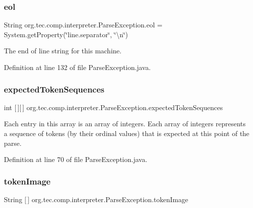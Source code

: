 \subsubsection{\texorpdfstring{eol}{eol}}
{\footnotesize\ttfamily String org.\+tec.\+comp.\+interpreter.\+Parse\+Exception.\+eol = System.\+get\+Property(\char`\"{}line.\+separator\char`\"{}, \char`\"{}\textbackslash{}n\char`\"{})\hspace{0.3cm}{\ttfamily [protected]}}

The end of line string for this machine. 

Definition at line 132 of file Parse\+Exception.\+java.

\mbox{\label{classorg_1_1tec_1_1comp_1_1interpreter_1_1_parse_exception_a8cf72289f91938ae2faa2a001b8c3ae3}} 
\subsubsection{\texorpdfstring{expected\+Token\+Sequences}{expectedTokenSequences}}
{\footnotesize\ttfamily int \mbox{[}$\,$\mbox{]}\mbox{[}$\,$\mbox{]} org.\+tec.\+comp.\+interpreter.\+Parse\+Exception.\+expected\+Token\+Sequences}

Each entry in this array is an array of integers. Each array of integers represents a sequence of tokens (by their ordinal values) that is expected at this point of the parse. 

Definition at line 70 of file Parse\+Exception.\+java.

\mbox{\label{classorg_1_1tec_1_1comp_1_1interpreter_1_1_parse_exception_a13a85a0e7a0e560a3191ed4f6be1c127}} 
\subsubsection{\texorpdfstring{token\+Image}{tokenImage}}
{\footnotesize\ttfamily String \mbox{[}$\,$\mbox{]} org.\+tec.\+comp.\+interpreter.\+Parse\+Exception.\+token\+Image}

